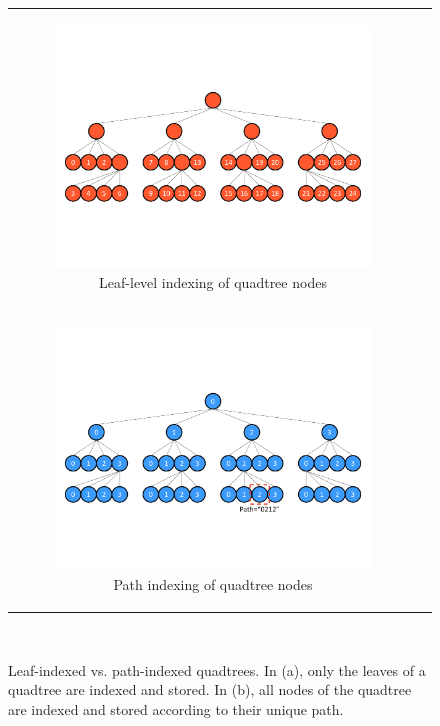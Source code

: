 \begin{figure}
\centering
\begin{tabular}{c c}
\smallskip
    \begin{subfigure}[t]{0.8\textwidth}
        \centering
        \includegraphics[width=\textwidth, clip=true, trim={0 150 0 150}]{../figures/leaf_indexing_tree.pdf}
        \caption{Leaf-level indexing of quadtree nodes}
    \end{subfigure}
    \\
    \begin{subfigure}[t]{0.8\textwidth}
        \centering
        \includegraphics[width=\textwidth, clip=true, trim={0 140 0 150}]{../figures/global_indexing_tree.pdf}
        \caption{Path indexing of quadtree nodes}
    \end{subfigure}
\end{tabular}\\
\caption{Leaf-indexed vs. path-indexed quadtrees. In (a), only the leaves of a quadtree are indexed and stored. In (b), all nodes of the quadtree are indexed and stored according to their unique path.}
\label{fig:quadtree_indexing}
\end{figure}

